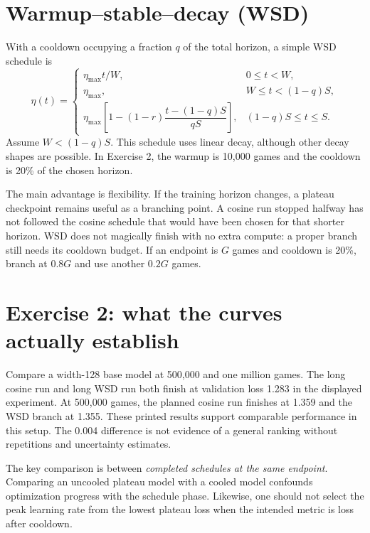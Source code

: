 \section{Warmup--stable--decay (WSD)}
With a cooldown occupying a fraction $q$ of the total horizon, a simple WSD schedule is
\begin{equation}
 \eta(t)=\begin{cases}
 \eta_{\max}t/W,&0\leq t<W,\\
 \eta_{\max},&W\leq t<(1-q)S,\\
 \eta_{\max}\left[1-(1-r)\dfrac{t-(1-q)S}{qS}\right],&(1-q)S\leq t\leq S.
 \end{cases}
\end{equation}
Assume $W<(1-q)S$. This schedule uses linear decay, although other decay shapes are possible. In Exercise 2, the warmup is 10,000 games and the cooldown is 20\% of the chosen horizon.

The main advantage is flexibility. If the training horizon changes, a plateau checkpoint remains useful as a branching point. A cosine run stopped halfway has not followed the cosine schedule that would have been chosen for that shorter horizon. WSD does not magically finish with no extra compute: a proper branch still needs its cooldown budget. If an endpoint is $G$ games and cooldown is 20\%, branch at $0.8G$ and use another $0.2G$ games.

\section{Exercise 2: what the curves actually establish}
Compare a width-128 base model at 500,000 and one million games. The long cosine run and long WSD run both finish at validation loss 1.283 in the displayed experiment. At 500,000 games, the planned cosine run finishes at 1.359 and the WSD branch at 1.355. These printed results support comparable performance in this setup. The 0.004 difference is not evidence of a general ranking without repetitions and uncertainty estimates.

The key comparison is between \emph{completed schedules at the same endpoint}. Comparing an uncooled plateau model with a cooled model confounds optimization progress with the schedule phase. Likewise, one should not select the peak learning rate from the lowest plateau loss when the intended metric is loss after cooldown.

